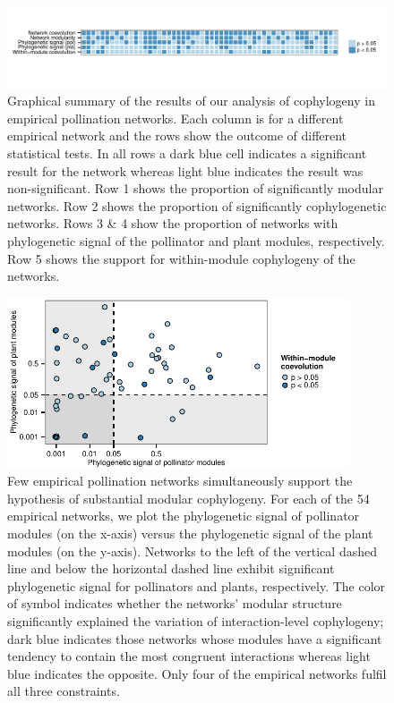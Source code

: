 \documentclass{article}
\begin{document}
\begin{figure}[ht]
\centerline{\includegraphics*[width=1.1\textwidth]{fig_presentedresults}}
\caption{Graphical summary of the results of our analysis of cophylogeny in empirical pollination networks. Each column is for a different empirical network and the rows show the outcome of different statistical tests. In all rows a dark blue cell indicates a significant result for the network whereas light blue indicates the result was non-significant. Row 1 shows the proportion of significantly modular networks. Row 2 shows the proportion of significantly cophylogenetic networks. Rows 3 \& 4 show the proportion of networks with phylogenetic signal of the pollinator and plant modules, respectively. Row 5 shows the support for within-module cophylogeny of the networks.}
\label{fig:metrictileplot}
\end{figure}
\clearpage

\begin{figure}[ht]
\centerline{\includegraphics*[width=0.90\textwidth]{fig_scatter}}
\caption{Few empirical pollination networks simultaneously support the hypothesis of substantial modular cophylogeny. For each of the 54 empirical networks, we plot the phylogenetic signal of pollinator modules (on the x-axis) versus the phylogenetic signal of the plant modules (on the y-axis). Networks to the left of the vertical dashed line and below the horizontal dashed line exhibit significant phylogenetic signal for pollinators and plants, respectively. The color of symbol indicates whether the networks' modular structure significantly explained the variation of interaction-level cophylogeny; dark blue indicates those networks whose modules have a significant tendency to contain the most congruent interactions whereas light blue indicates the opposite. Only four of the empirical networks fulfil all three constraints.}
\label{fig:scatter}
\end{figure}
\clearpage
\end{document}
